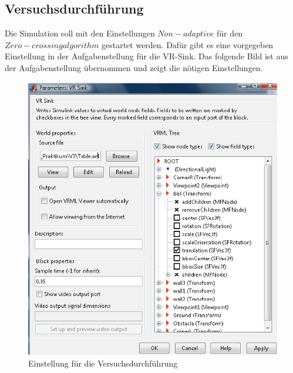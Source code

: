 \documentclass[]{scrartcl}
\begin{document}
\subsection{Versuchsdurchführung}

Die Simulation soll mit den Einstellungen $Non-adaptive$ für den $Zero-crossing algorithm$  gestartet werden. Dafür gibt es eine vorgegeben Einstellung in der Aufgabenstellung für die VR-Sink. Das folgende Bild ist aus der Aufgabenstellung übernommen und zeigt die nötigen Einstellungen.


\begin{figure}[H]
\centering
\includegraphics[width=0.8\linewidth]{./einstellungen_schieferFlipper}
\caption{Einstellung für die Versuchsdurchführung}
\label{fig:2_einstellungen_schieferFlipper}
\end{figure}
 
\end{document}
